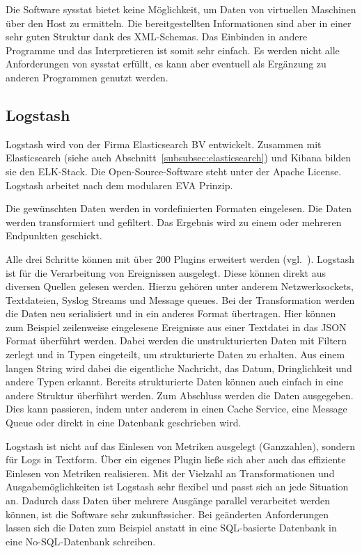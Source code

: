 Die Software sysstat bietet keine Möglichkeit, um Daten von virtuellen
Maschinen über den Host zu ermitteln. Die bereitgestellten Informationen sind
aber in einer sehr guten Struktur dank des \gls{XML}\hyp{}Schemas. Das
Einbinden in andere Programme und das Interpretieren ist somit sehr einfach.
Es werden nicht alle Anforderungen von sysstat erfüllt, es kann aber eventuell
als Ergänzung zu anderen Programmen genutzt werden.
\tm%

\subsection{Logstash}
\label{subsec:logstash}
Logstash wird von der Firma Elasticsearch BV entwickelt. Zusammen mit
Elasticsearch (siehe auch Abschnitt~\ref{subsubsec:elasticsearch}) und
\gls{Kibana} bilden sie den ELK\hyp{}Stack. Die Open\hyp{}Source\hyp{}Software
steht unter der Apache License. Logstash arbeitet nach dem modularen \gls{EVA}
Prinzip.

\begin{outline}
  \1 Die gewünschten Daten werden in vordefinierten Formaten eingelesen.
  \1 Die Daten werden transformiert und gefiltert.
  \1 Das Ergebnis wird zu einem oder mehreren Endpunkten geschickt.
\end{outline}

Alle drei Schritte können mit über 200 Plugins erweitert
werden (vgl.~\cite{logstash_overview}). Logstash ist für die Verarbeitung von
Ereignissen ausgelegt. Diese können direkt aus diversen Quellen gelesen werden.
Hierzu gehören unter anderem Netzwerksockets, Textdateien, Syslog Streams und
Message queues. Bei der Transformation werden die Daten neu serialisiert und in
ein anderes Format übertragen. Hier können zum Beispiel zeilenweise eingelesene
Ereignisse aus einer Textdatei in das \gls{JSON} Format überführt werden. Dabei
werden die unstrukturierten Daten mit Filtern zerlegt und in Typen eingeteilt,
um strukturierte Daten zu erhalten. Aus einem langen String wird dabei die
eigentliche Nachricht, das Datum, Dringlichkeit und andere Typen erkannt.
Bereits strukturierte Daten können auch einfach in eine andere Struktur
überführt werden. Zum Abschluss werden die Daten ausgegeben. Dies kann
passieren, indem unter anderem in einen Cache Service, eine Message Queue oder
direkt in eine Datenbank geschrieben wird.

Logstash ist nicht auf das Einlesen von Metriken ausgelegt (Ganzzahlen),
sondern für Logs in Textform. Über ein eigenes Plugin ließe sich aber auch das
effiziente Einlesen von Metriken realisieren. Mit der Vielzahl an
Transformationen und Ausgabemöglichkeiten ist Logstash sehr flexibel und passt
sich an jede Situation an. Dadurch dass Daten über mehrere Ausgänge parallel
verarbeitet werden können, ist die Software sehr zukunftssicher. Bei geänderten
Anforderungen lassen sich die Daten zum Beispiel anstatt in eine
\gls{SQL}\hyp{}basierte Datenbank in eine No\hyp{}\gls{SQL}\hyp{}Datenbank
schreiben.
\tm%

